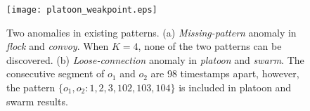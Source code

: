 \begin{figure}[h]
\center
\texttt{[image: platoon\_weakpoint.eps]}
\caption{Two anomalies in existing patterns. (a) \emph{Missing-pattern} anomaly
in \emph{flock} and \emph{convoy}. When $K=4$, none of the two patterns can be discovered. (b) \emph{Loose-connection} anomaly in \emph{platoon} and \emph{swarm}. The consecutive segment of $o_1$ and $o_2$ are 98 timestamps apart, however, the pattern $\{o_1, o_2: 1,2,3,102,103,104\}$ is included in platoon and swarm results.}
\label{fig:platoon_weakpoint}
\end{figure}

%
%
%
%




